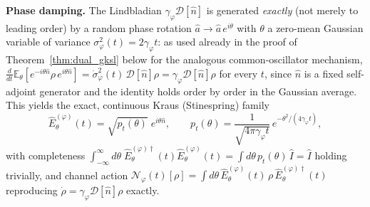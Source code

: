 \documentclass[journal]{IEEEtran}
\begin{document}
\textbf{Phase damping.} The Lindbladian $\gamma_\varphi\mathcal D[\hat n]$ is generated \emph{exactly} (not merely to leading order) by a random phase rotation $\hat a\to\hat a\,e^{i\theta}$ with $\theta$ a zero-mean Gaussian variable of variance $\sigma_\varphi^2(t)=2\gamma_\varphi t$: as used already in the proof of Theorem~\ref{thm:dual_gksl} below for the analogous common-oscillator mechanism, $\tfrac{d}{dt}\mathbb E_\theta[e^{-i\theta\hat n}\rho\,e^{i\theta\hat n}]=\dot\sigma_\varphi^2(t)\,\mathcal D[\hat n]\rho=\gamma_\varphi\mathcal D[\hat n]\rho$ for every $t$, since $\hat n$ is a fixed self-adjoint generator and the identity holds order by order in the Gaussian average. This yields the exact, continuous Kraus (Stinespring) family
\begin{equation}\label{eq:kraus_phase}
\hat{E}_\theta^{(\varphi)}(t) = \sqrt{p_t(\theta)}\;e^{i\theta\hat n}, \qquad p_t(\theta)=\frac{1}{\sqrt{4\pi\gamma_\varphi t}}\,e^{-\theta^2/(4\gamma_\varphi t)},
\end{equation}
with completeness $\int_{-\infty}^{\infty}d\theta\;\hat E_\theta^{(\varphi)\dagger}(t)\hat E_\theta^{(\varphi)}(t)=\int d\theta\,p_t(\theta)\,\hat I=\hat I$ holding trivially, and channel action $\mathcal N_\varphi(t)[\rho]=\int d\theta\,\hat E_\theta^{(\varphi)}(t)\,\rho\,\hat E_\theta^{(\varphi)\dagger}(t)$ reproducing $\dot\rho=\gamma_\varphi\mathcal D[\hat n]\rho$ exactly.
\end{document}
